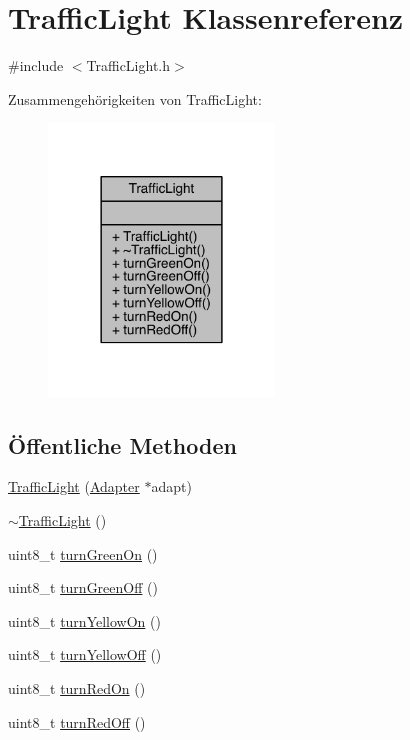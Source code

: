 \hypertarget{class_traffic_light}{}\section{Traffic\+Light Klassenreferenz}
\label{class_traffic_light}


{\ttfamily \#include $<$Traffic\+Light.\+h$>$}



Zusammengehörigkeiten von Traffic\+Light\+:\nopagebreak
\begin{figure}[H]
\begin{center}
\leavevmode
\includegraphics[width=170pt]{class_traffic_light__coll__graph}
\end{center}
\end{figure}
\subsection*{Öffentliche Methoden}
\begin{DoxyCompactItemize}
\item 
\hyperlink{class_traffic_light_ac34af2ea06577584a1c30a4f40e2d521}{Traffic\+Light} (\hyperlink{class_adapter}{Adapter} $\ast$adapt)
\item 
\hyperlink{class_traffic_light_a3dd2a89a028c1586ced0ab587dda8cc1}{$\sim$\+Traffic\+Light} ()
\item 
uint8\+\_\+t \hyperlink{class_traffic_light_a9477c1e61facd79e308b297877e3beee}{turn\+Green\+On} ()
\item 
uint8\+\_\+t \hyperlink{class_traffic_light_a958814eefaf288da1e103bf32c5c38b9}{turn\+Green\+Off} ()
\item 
uint8\+\_\+t \hyperlink{class_traffic_light_a74b400dafd029a2cfde6c27434111d21}{turn\+Yellow\+On} ()
\item 
uint8\+\_\+t \hyperlink{class_traffic_light_a17723c3478b4eb754aa8b163234aa8be}{turn\+Yellow\+Off} ()
\item 
uint8\+\_\+t \hyperlink{class_traffic_light_acd3d36d6884744b2230bd234bff27357}{turn\+Red\+On} ()
\item 
uint8\+\_\+t \hyperlink{class_traffic_light_a2ca2808ea156abc199a14939c2ab0c92}{turn\+Red\+Off} ()
\end{DoxyCompactItemize}


